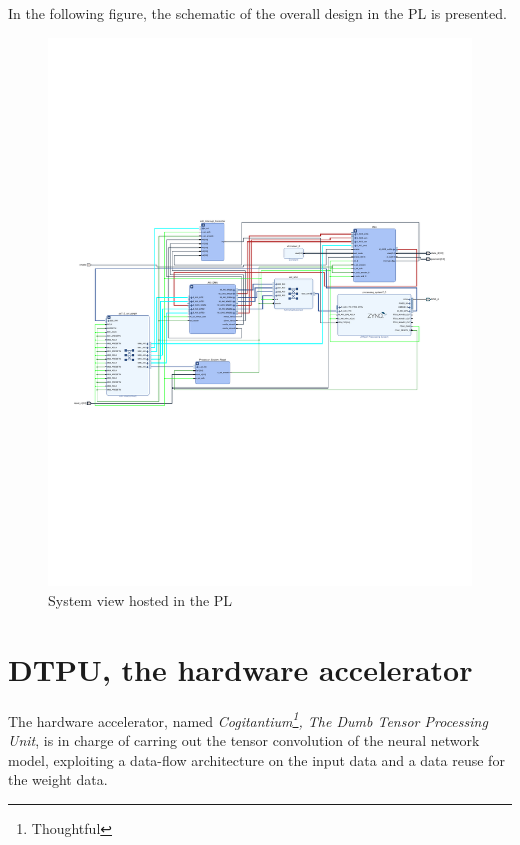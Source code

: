 \newpage
In the following figure, the schematic of the overall design in the PL is presented.
\begin{figure}[!htbp]
\centering
\captionsetup{justification=centering}
\includegraphics[scale=1,angle=90]{./figure/system_schematic.pdf}
\caption{System view hosted in the PL \protect\footnotemark}
\label{fig:sys}
\end{figure}
\section{DTPU, the hardware accelerator}
The hardware accelerator, named \textit{ Cogitantium\footnote{Thoughtful}, The Dumb Tensor Processing Unit}, is in charge of carring out the tensor convolution of the neural network model, exploiting a data-flow architecture on the input data and a data reuse for the weight data.

